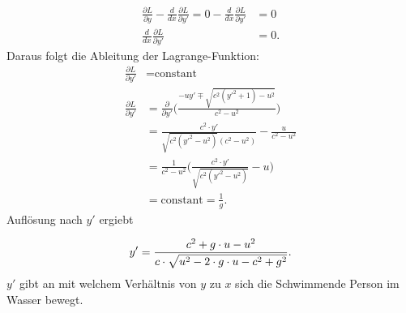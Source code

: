 \begin{align}
    \frac{\partial L}{\partial y} - \frac{d}{dx}\frac{\partial L}{\partial y'} = 0 - \frac{d}{dx}\frac{\partial L}{\partial y'} &= 0 \\
    \frac{d}{dx}\frac{\partial L}{\partial y'} &= 0.
\end{align}
Daraus folgt die Ableitung der Lagrange-Funktion:
\begin{align}
    \frac{\partial L}{\partial y'} &= \text{constant} \label{eq:Lagrange_derivites_1}\\
    \frac{\partial L}{\partial y'} &= \frac{\partial}{\partial y'} \biggl (\frac{-uy' \mp \sqrt{c^2(y'^2+1)-u^2}}{c^2-u^2}\biggr) \\
    &= \frac{c^2\cdot y'}{\sqrt{c^2(y'^2-u^2)}(c^2-u^2)} - \frac{u}{c^2-u^2} \\
    &=  \frac{1}{c^2-u^2} \biggl( \frac{c^2\cdot y'}{\sqrt{c^2(y'^2-u^2)}} - u \biggr ) \\
    &= \text{constant} = \frac{1}{g}.\label{eq:Lagrange_derivites_2}
\end{align}
Auflösung nach \(y'\) ergiebt
   
\begin{equation}
    y' = \frac{c^2 + g\cdot u - u^2}{c \cdot \sqrt{u^2-2\cdot g\cdot u - c^2 + g^2}} .\label{eq:angle} \\
\end{equation}
\(y'\) gibt an mit welchem Verhältnis von \(y\) zu \(x\) sich die Schwimmende Person im Wasser bewegt.

































